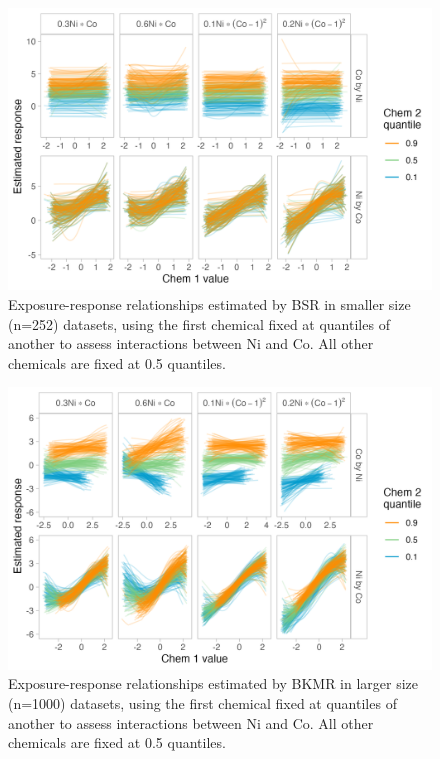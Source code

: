 \documentclass[12pt, twoside]{amherstthesis}
\begin{document}
\begin{figure}

{\centering \includegraphics[width=0.85\linewidth]{figures/ch4_ssm_biv_expresp_3} 

}

\caption{Exposure-response relationships estimated by BSR in smaller size (n=252) datasets, using the first chemical fixed at quantiles of another to assess interactions between Ni and Co. All other chemicals are fixed at 0.5 quantiles.}\label{fig:ssmnico}
\end{figure}
\begin{figure}

{\centering \includegraphics[width=0.85\linewidth]{figures/ch4_klg_biv_expresp_3} 

}

\caption{Exposure-response relationships estimated by BKMR in larger size (n=1000) datasets, using the first chemical fixed at quantiles of another to assess interactions between Ni and Co. All other chemicals are fixed at 0.5 quantiles.}\label{fig:klgnico}
\end{figure}
\end{document}
